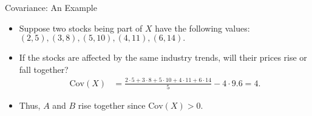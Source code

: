 \begin{frame}{Covariance: An Example}
	\begin{itemize}
		\item Suppose two stocks being part of $X$ have the following values:\\
		      $(2,5), (3,8), (5,10), (4,11), (6,14).$
		\item If the stocks are affected by the same industry trends, will
		      their prices rise or fall together?
		      \begin{align}
			      \text{Cov}(X) & = \frac{2\cdot5 + 3\cdot 8 + 5 \cdot 10 + 4 \cdot
				      11 + 6 \cdot 14}{5} - 4\cdot 9.6 = 4.
		      \end{align}
		\item Thus, $A$ and $B$ rise together since $\text{Cov}(X) > 0$.
	\end{itemize}
\end{frame}
